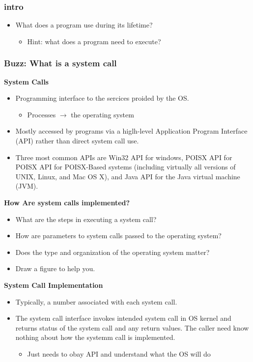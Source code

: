 
\subsubsection*{intro}
\begin{itemize}
\item What does a program use during its lifetime?
  \begin{itemize}
  \item Hint: what does a program need to execute?
  \end{itemize}
\end{itemize}

\subsubsection*{Buzz: What is a system call}

\textbf{System Calls}

\begin{itemize}
\item Programming interface to the sercices proided by the OS.
  \begin{itemize}
  \item Processes $\rightarrow$ the operating system
  \end{itemize}
\item Mostly accessed by programs via a higlh-level Application Program Interface (API) rather than direct system call use.
\item Three most common APIs are Win32 API for windows, POISX API for POISX API for POISX-Based systems (including virtually all versions of UNIX, Linux, and Mac OS X), and Java API for the Java virtual machine (JVM).
\end{itemize}

\textbf{How Are system calls implemented?}

\begin{itemize}
\item What are the steps in executing a system call?
\item How are parameters to system calls passed to the operating system?
\item Does the type and organization of the operating system matter?
\item Draw a figure to help you.
\end{itemize}

\textbf{System Call Implementation}

\begin{itemize}
\item Typically, a number associated with each system call.
\item The system call interface invokes intended system call in OS kernel and returns status of the system call and any return values.
  The caller need know nothing about how the systemm call is implemented.
  \begin{itemize}
  \item Just needs to obay API and understand what the OS will do
  \end{itemize}
\end{itemize}
